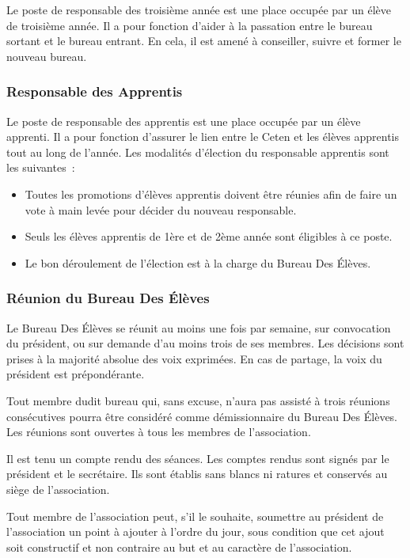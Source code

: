 \documentclass{article} %
\begin{document}
				Le poste de responsable des troisième année est une place
				occupée par un élève de troisième année. Il a pour fonction
				d’aider à la passation entre le bureau sortant et le bureau
				entrant. En cela, il est amené à conseiller, suivre et former le
				nouveau bureau.

			\subsubsection{Responsable des Apprentis}

				Le poste de responsable des apprentis est une place occupée par
				un élève apprenti. Il a pour fonction d’assurer le lien entre le
				Ceten et les élèves apprentis tout au long de l’année. Les
				modalités d’élection du responsable apprentis sont les
				suivantes :
				\begin{itemize}
					\item Toutes les promotions d’élèves apprentis doivent être
						réunies afin de faire un vote à main levée pour décider
						du nouveau responsable.
					\item Seuls les élèves apprentis de 1ère et de 2ème année
						sont éligibles à ce poste.
					\item Le bon déroulement de l’élection est à la charge du
						Bureau Des Élèves.
				\end{itemize}

			\subsubsection{Réunion du Bureau Des Élèves}

				Le Bureau Des Élèves se réunit au moins une fois par semaine,
				sur convocation du président, ou sur demande d'au moins trois de
				ses membres. Les décisions sont prises à la majorité absolue des
				voix exprimées. En cas de partage, la voix du président est
				prépondérante. 

				Tout membre dudit bureau qui, sans excuse, n’aura pas assisté à
				trois réunions consécutives pourra être considéré comme
				démissionnaire du Bureau Des Élèves. Les réunions sont ouvertes
				à tous les membres de l’association.

				Il est tenu un compte rendu des séances. Les comptes rendus sont
				signés par le président et le secrétaire. Ils sont établis sans
				blancs ni ratures et conservés au siège de l’association.

				Tout membre de l’association peut, s’il le souhaite, soumettre
				au président de l’association un point à ajouter à l’ordre du
				jour, sous condition que cet ajout soit constructif et non
				contraire au but et au caractère de l’association.
\end{document}
